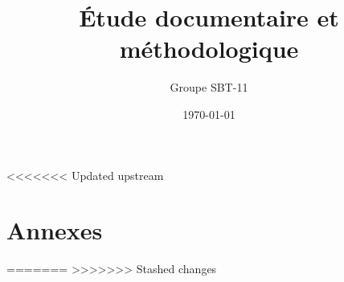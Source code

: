 \documentclass[12pt,oneside,a4paper]{article}
\title{\'Etude documentaire et m\'ethodologique}
\author{Groupe SBT-11}
\date{\today}
\begin{document}
\maketitle



\newpage

\newpage

\newpage

\newpage

\newpage

\newpage

\newpage

\newpage


<<<<<<< Updated upstream
\appendix
\part*{Annexes}


=======
%
>>>>>>> Stashed changes
\end{document}
